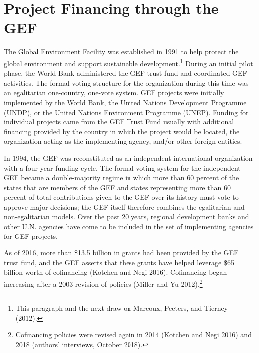 \documentclass{article}
\begin{document}
\section{Project Financing through the GEF}
The Global Environment Facility was established in 1991 to help protect the global environment and support sustainable development.\footnote{  This paragraph and the next draw on Marcoux, Peeters, and Tierney (2012).}   During an initial pilot phase, the World Bank administered the GEF trust fund and coordinated GEF activities.  The formal voting structure for the organization during this time was an egalitarian one-country, one-vote system.  GEF projects were initially implemented by the World Bank, the United Nations Development Programme (UNDP), or the United Nations Environment Programme (UNEP).  Funding for individual projects came from the GEF Trust Fund usually with additional financing provided by the country in which the project would be located, the organization acting as the implementing agency, and/or other foreign entities.

In 1994, the GEF was reconstituted as an independent international organization with a four-year funding cycle.  The formal voting system for the independent GEF became a double-majority regime in which more than 60 percent of the states that are members of the GEF and states representing more than 60 percent of total contributions given to the GEF over its history must vote to approve major decisions; the GEF itself therefore combines the egalitarian and non-egalitarian models.  Over the past 20 years, regional development banks and other U.N. agencies have come to be included in the set of implementing agencies for GEF projects.   

As of 2016, more than \$13.5 billion in grants had been provided by the GEF trust fund, and the GEF asserts that these grants have helped leverage \$65 billion worth of cofinancing (Kotchen and Negi 2016).  Cofinancing began increasing after a 2003 revision of policies (Miller and Yu 2012).\footnote{Cofinancing policies were revised again in 2014 (Kotchen and Negi 2016) and 2018 (authors’ interviews, October 2018).}   
\end{document}
